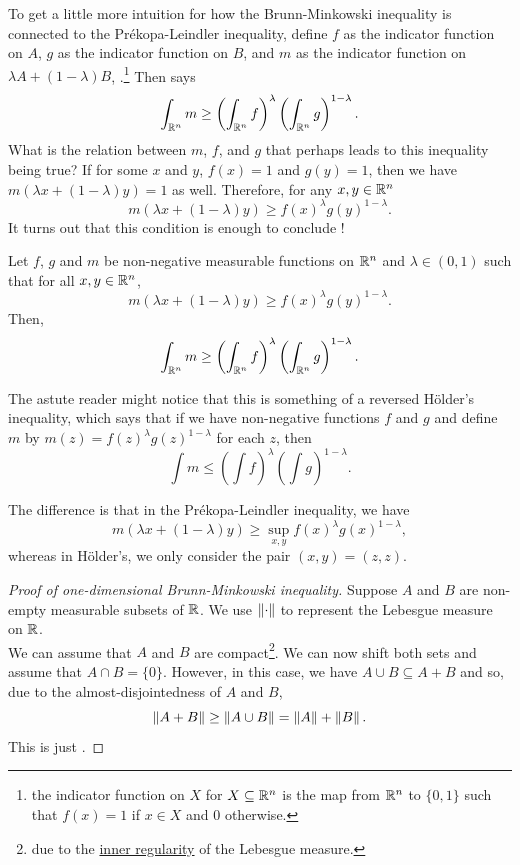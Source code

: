 To get a little more intuition for how the Brunn-Minkowski inequality is connected to the Pr\'{e}kopa-Leindler inequality, define $f$ as the indicator function on $A$, $g$ as the indicator function on $B$, and $m$ as the indicator function on $\lambda A+(1-\lambda)B$, .\footnote{the indicator function on $X$ for $X\subseteq \mathbb{R}^n$ is the map from $\mathbb{R}^n$ to $\{0,1\}$ such that $f(x)=1$ if $x\in X$ and $0$ otherwise.} Then  says
\[ \int_{\mathbb{R}^n} m \geq \left(\int_{\mathbb{R}^n}f\right)^\lambda \left(\int_{\mathbb{R}^n}g\right)^{1-\lambda}. \]
What is the relation between $m$, $f$, and $g$ that perhaps leads to this inequality being true? If for some $x$ and $y$, $f(x)=1$ and $g(y)=1$, then we have $m(\lambda x + (1-\lambda)y)=1$ as well. Therefore, for any $x,y\in\mathbb{R}^n$
\[ m(\lambda x + (1-\lambda)y) \geq f(x)^{\lambda}g(y)^{1-\lambda}. \]
It turns out that this condition is enough to conclude !

\begin{ftheo}
\label{prekopa leindler}
Let $f$, $g$ and $m$ be non-negative measurable functions on $\mathbb{R}^n$ and $\lambda\in(0,1)$ such that for all $x,y\in\mathbb{R}^n$,
\begin{equation}
\label{eqn prekopa leindler}
    m(\lambda x + (1-\lambda)y) \geq f(x)^{\lambda}g(y)^{1-\lambda}.
\end{equation}
Then,
\[ \int_{\mathbb{R}^n} m \geq \left(\int_{\mathbb{R}^n}f\right)^\lambda \left(\int_{\mathbb{R}^n}g\right)^{1-\lambda}. \]
\end{ftheo}

The astute reader might notice that this is something of a reversed H\"{o}lder's inequality, which says that if we have non-negative functions $f$ and $g$ and define $m$ by $m(z) = f(z)^{\lambda}g(z)^{1-\lambda}$ for each $z$, then
\begin{equation}
\label{eqn holder's inequality}
    \int m \leq \left(\int f\right)^\lambda \left(\int g\right)^{1-\lambda}.
\end{equation}

The difference is that in the Pr\'{e}kopa-Leindler inequality, we have
\[ m(\lambda x + (1-\lambda)y) \geq \sup_{x,y} f(x)^\lambda g(x)^{1-\lambda}, \]
whereas in H\"older's, we only consider the pair $(x,y)=(z,z)$.\\

\begin{proof}[Proof of one-dimensional Brunn-Minkowski inequality]
Suppose $A$ and $B$ are non-empty measurable subsets of $\mathbb{R}$. We use $\left\lVert\cdot\right\rVert$ to represent the Lebesgue measure on $\mathbb{R}$.\\
We can assume that $A$ and $B$ are compact\footnote{due to the \href{https://en.wikipedia.org/wiki/Regular_measure}{inner regularity} of the Lebesgue measure.}. We can now shift both sets and assume that $A\cap B = \{0\}$. However, in this case, we have $A\cup B\subseteq A+B$ and so, due to the almost-disjointedness of $A$ and $B$,
\[ \left\lVert A+B\right\rVert \geq \left\lVert A\cup B\right\rVert = \left\lVert A\right\rVert+\left\lVert B\right\rVert. \]
This is just .
\end{proof}

